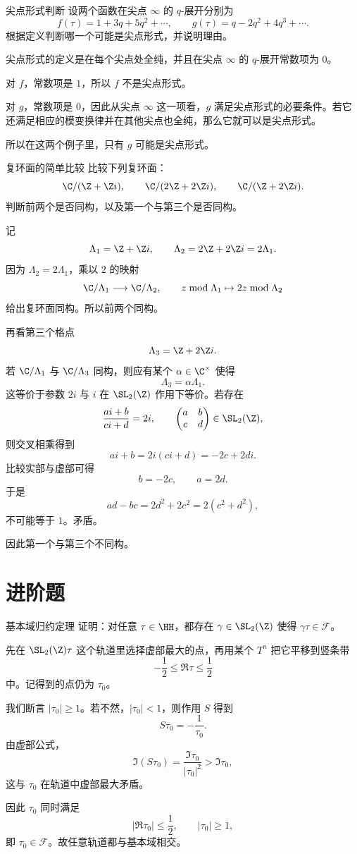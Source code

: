 \begin{problem}{尖点形式判断}
\easy
设两个函数在尖点 $\infty$ 的 $q$-展开分别为
\[
f(\tau)=1+3q+5q^2+\cdots,
\qquad
 g(\tau)=q-2q^2+4q^3+\cdots.
\]
根据定义判断哪一个可能是尖点形式，并说明理由。
\end{problem}
\begin{solution}
尖点形式的定义是在每个尖点处全纯，并且在尖点 $\infty$ 的 $q$-展开常数项为 $0$。

对 $f$，常数项是 $1$，所以 $f$ 不是尖点形式。

对 $g$，常数项是 $0$，因此从尖点 $\infty$ 这一项看，$g$ 满足尖点形式的必要条件。若它还满足相应的模变换律并在其他尖点也全纯，那么它就可以是尖点形式。

所以在这两个例子里，只有 $g$ 可能是尖点形式。
\end{solution}

\begin{problem}{复环面的简单比较}
\easy
比较下列复环面：
\[
\C/(\Z+\Z i),\qquad \C/(2\Z+2\Z i),\qquad \C/(\Z+2\Z i).
\]
判断前两个是否同构，以及第一个与第三个是否同构。
\end{problem}
\begin{solution}
记
\[
\Lambda_1=\Z+\Z i,
\qquad
\Lambda_2=2\Z+2\Z i=2\Lambda_1.
\]
因为 $\Lambda_2=2\Lambda_1$，乘以 $2$ 的映射
\[
\C/\Lambda_1\longrightarrow \C/\Lambda_2,
\qquad z\bmod \Lambda_1\mapsto 2z\bmod \Lambda_2
\]
给出复环面同构。所以前两个同构。

再看第三个格点
\[
\Lambda_3=\Z+2\Z i.
\]
若 $\C/\Lambda_1$ 与 $\C/\Lambda_3$ 同构，则应有某个 $\alpha\in\C^{\times}$ 使得
\[
\Lambda_3=\alpha\Lambda_1.
\]
这等价于参数 $2i$ 与 $i$ 在 $\SL_2(\Z)$ 作用下等价。若存在
\[
\frac{ai+b}{ci+d}=2i,
\qquad
\begin{pmatrix}a&b\\c&d\end{pmatrix}\in\SL_2(\Z),
\]
则交叉相乘得到
\[
ai+b=2i(ci+d)=-2c+2di.
\]
比较实部与虚部可得
\[
b=-2c,\qquad a=2d.
\]
于是
\[
ad-bc=2d^2+2c^2=2(c^2+d^2),
\]
不可能等于 $1$。矛盾。

因此第一个与第三个不同构。
\end{solution}

\section{进阶题 \medium}

\begin{problem}{基本域归约定理}
\medium
证明：对任意 $\tau\in\HH$，都存在 $\gamma\in\SL_2(\Z)$ 使得 $\gamma\tau\in\mathcal{F}$。
\end{problem}
\begin{solution}
先在 $\SL_2(\Z)\tau$ 这个轨道里选择虚部最大的点，再用某个 $T^n$ 把它平移到竖条带
\[
-\frac12\leq \Re\tau\leq \frac12
\]
中。记得到的点仍为 $\tau_0$。

我们断言 $|\tau_0|\geq 1$。若不然，$|\tau_0|<1$，则作用 $S$ 得到
\[
S\tau_0=-\frac1{\tau_0}.
\]
由虚部公式，
\[
\Im(S\tau_0)=\frac{\Im\tau_0}{|\tau_0|^2}>\Im\tau_0,
\]
这与 $\tau_0$ 在轨道中虚部最大矛盾。

因此 $\tau_0$ 同时满足
\[
|\Re\tau_0|\leq \frac12,
\qquad
|\tau_0|\geq 1,
\]
即 $\tau_0\in\mathcal{F}$。故任意轨道都与基本域相交。
\end{solution}

